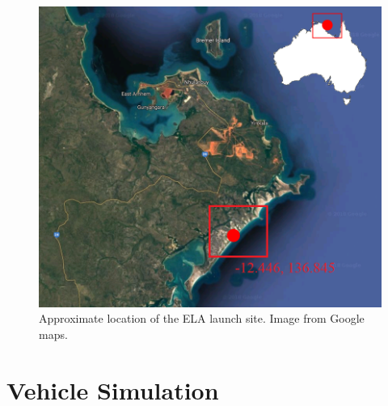 \begin{figure}[ht]
	\centering
	\includegraphics[width=0.7\linewidth]{figures/4_LODESTAR/SiteLocation}
	\caption{Approximate location of the ELA launch site. Image from Google maps.}
	\label{fig:SiteLocation}
\end{figure}


\section{Vehicle Simulation}

